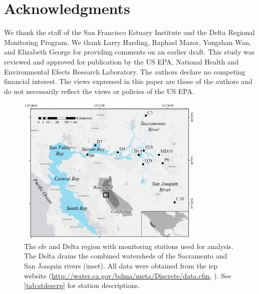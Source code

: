 \documentclass[letterpaper,12pt,oneside]{article}\usepackage[]{graphicx}\usepackage[]{color}
\begin{document}
\section*{Acknowledgments}

We thank the staff of the San Francisco Estuary Institute and the Delta Regional Monitoring Program. We thank Larry Harding, Raphael Mazor, Yongshan Wan, and Elizabeth George for providing comments on an earlier draft. This study was reviewed and approved for publication by the US EPA, National Health and Environmental Efects Research Laboratory. The authors declare no competing financial interest. The views expressed in this paper are those of the authors and do not necessarily reflect the views or policies of the US EPA. 

\begin{singlespace}


\end{singlespace}
\clearpage


\begin{figure}
\centering
\includegraphics[width=0.8\textwidth,page=1]{figs/delt_map.pdf}
\caption{The \acl{sfe} and Delta region with monitoring stations used for analysis. The Delta drains the combined watersheds of the Sacramento and San Joaquin rivers (inset). All data were obtained from the \acl{iep} website (\url{http://water.ca.gov/bdma/meta/Discrete/data.cfm}, \cite{IEP13}). See \cref{tab:stdescrp} for station descriptions.}
\label{fig:delt_map}   
\end{figure}
\end{document}
